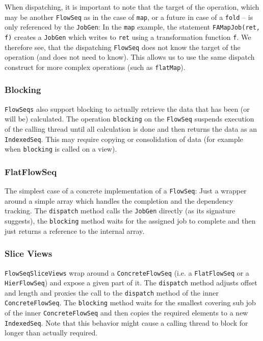 \documentclass[runningheads,a4paper,fleqn]{llncs}
\begin{document}
When dispatching, it is important to note that the target of the
operation, which may be another \texttt{FlowSeq} as in the case of
\texttt{map}, or a future in case of a \texttt{fold} -- is only
referenced by the \texttt{JobGen}: In the \texttt{map} example, the
statement \texttt{FAMapJob(ret, f)} creates a
\texttt{JobGen} which writes to \texttt{ret} using a transformation
function \texttt{f}. We therefore see, that the dispatching \texttt{FlowSeq}
does not know the target of the operation (and does not need to
know). This allows us to use the same dispatch construct for more
complex operations (such as \texttt{flatMap}).

\subsubsection{Blocking}
\texttt{FlowSeqs} also support blocking to actually retrieve the data that
has been (or will be) calculated. The operation \texttt{blocking} on
the \texttt{FlowSeq} suspends execution of the calling thread until all
calculation is done and then returns the data as an
\texttt{IndexedSeq}. This may require copying or consolidation of data
(for example when \texttt{blocking} is called on a view).

\subsubsection{FlatFlowSeq}
The simplest case of a concrete implementation of a \texttt{FlowSeq}: Just a
wrapper around a simple array which handles the completion and the
dependency tracking. The \texttt{dispatch} method calls the
\texttt{JobGen} directly (as its signature suggests), the
\texttt{blocking} method waits for the assigned job to complete and
then just returns a reference to the internal array.

\subsubsection{Slice Views}
\label{sssec:slice-views}
\texttt{FlowSeqSliceViews} wrap around a \texttt{ConcreteFlowSeq}
(i.e. a \texttt{FlatFlowSeq} or a \texttt{HierFlowSeq})
and expose a given part of it. The \texttt{dispatch} method adjusts 
offset and length and proxies the call to the \texttt{dispatch} method
of the inner
\texttt{ConcreteFlowSeq}. The \texttt{blocking} method waits for the
smallest covering sub job of the inner \texttt{ConcreteFlowSeq} and
then copies the required elements to a new \texttt{IndexedSeq}. Note
that this behavior might cause a calling thread to block for longer
than actually required.
\end{document}

